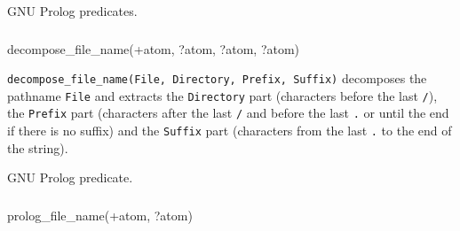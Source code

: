 \Portability

GNU Prolog predicates.

\subsubsection{}

\begin{TemplatesOneCol}
decompose\_file\_name(+atom, ?atom, ?atom, ?atom)

\end{TemplatesOneCol}

\Description

\texttt{decompose\_file\_name(File, Directory, Prefix, Suffix)} decomposes
the pathname \texttt{File} and extracts the \texttt{Directory} part
(characters before the last \texttt{/}), the \texttt{Prefix} part
(characters after the last \texttt{/} and before the last \texttt{.} or
until the end if there is no suffix) and the \texttt{Suffix} part
(characters from the last \texttt{.} to the end of the string).

\begin{PlErrors}






\end{PlErrors}

\Portability

GNU Prolog predicate.

\subsubsection{\label{prolog-file-name/2}}

\begin{TemplatesOneCol}
prolog\_file\_name(+atom, ?atom)

\end{TemplatesOneCol}

